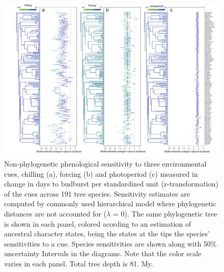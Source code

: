 \documentclass[11pt]{article}
\begin{document}
\begin{figure}
  \begin{center}
  \includegraphics[width=16cm]{../../analyses/phylogeny/figures/FigSXX_ phylo_muplots191_lamb0.pdf}
  \caption{Non-phylogenetic phenological sensitivity to three environmental cues, chilling (a), forcing (b) and photoperiod (c) measured in change in days to budburst per standardized unit (z-transformation) of the cues across 191 tree species. Sensitivity estimates are computed by commonly used hierarchical model where phylogenetic distances are not accounted for ($\lambda$ = 0). The same phylogenetic tree is shown in each panel, colored acording to an estimation of ancestral character states, being the states at the tips the species' sensitivities to a cue. Species sensitivities are shown along with 50\% uncertainty Intervals in the diagrams. Note that the color scale varies in each panel. Total tree depth is 81. My.}
  \label{fig:suppmuplot_all} %
  \end{center}
\end{figure}
\end{document}
